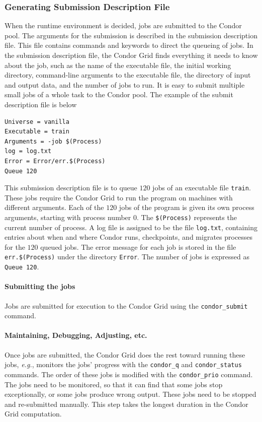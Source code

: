 \subsubsection{Generating Submission Description File} When the runtime environment is decided, jobs are submitted to the Condor pool. The arguments for the submission is described in the submission description file. This file contains commands and keywords to direct the queueing of jobs. In the submission description file, the Condor Grid finds everything it needs to know about the job, such as the name of the executable file, the initial working directory, command-line arguments to the executable file, the directory of input and output data, and the number of jobs to run. It is easy to submit multiple small jobs of a whole task to the Condor pool. The example of the submit description file is below
\begin{verbatim}
Universe = vanilla
Executable = train
Arguments = -job $(Process)
log = log.txt
Error = Error/err.$(Process)
Queue 120 
\end{verbatim} 
This submission description file is to queue $120$ jobs of an executable file \verb|train|. These jobs require the Condor Grid to run the program on machines with different arguments. Each of the $120$ jobs of the program is given its own process arguments, starting with process number $0$. The \verb|$(Process)| represents the current number of process. A log file is assigned to be the file \verb|log.txt|, containing entries about when and where Condor runs, checkpoints, and migrates processes for the $120$ queued jobs. The error message for each job is stored in the file \verb|err.$(Process)| under the directory \verb|Error|. The number of jobs is expressed as \verb|Queue 120|.

\paragraph{Submitting the jobs} Jobs are submitted for execution to the Condor Grid using the \verb|condor_submit| command. 

\paragraph{Maintaining, Debugging, Adjusting, etc.} Once jobs are submitted, the Condor Grid does the rest toward running these jobs, \textit{e.g.}, monitors the jobs' progress with the \verb|condor_q| and \verb|condor_status| commands. The order of these jobs is modified with the \verb|condor_prio| command. The jobs need to be monitored, so that it can find that some jobs stop exceptionally, or some jobs produce wrong output. These jobs need to be stopped and re-submitted manually. This step takes the longest duration in the Condor Grid computation.

